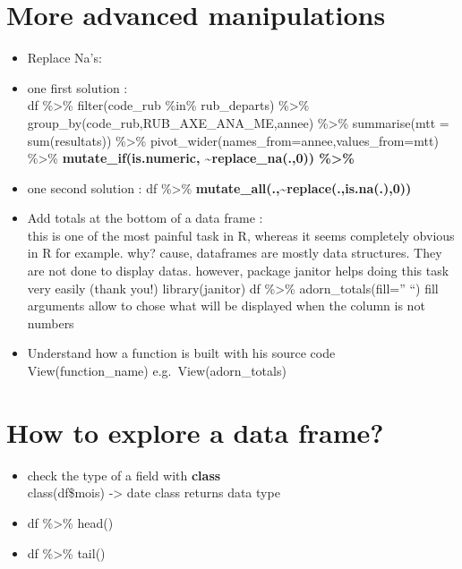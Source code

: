 \documentclass[
]{book}
\begin{document}
\hypertarget{more-advanced-manipulations}{%
\section{More advanced manipulations}\label{more-advanced-manipulations}}

\begin{itemize}
\item
  Replace Na's:\\
\item
  one first solution :\\
  df \%\textgreater\% filter(code\_rub \%in\% rub\_departs) \%\textgreater\%
  group\_by(code\_rub,RUB\_AXE\_ANA\_ME,annee) \%\textgreater\% summarise(mtt = sum(resultats)) \%\textgreater\%
  pivot\_wider(names\_from=annee,values\_from=mtt) \%\textgreater\% \textbf{mutate\_if(is.numeric, \textasciitilde replace\_na(.,0)) \%\textgreater\%}
\item
  one second solution :
  df \%\textgreater\% \textbf{mutate\_all(.,\textasciitilde replace(.,is.na(.),0))}
\item
  Add totals at the bottom of a data frame :\\
  this is one of the most painful task in R, whereas it seems completely obvious in R for example.
  why? cause, dataframes are mostly data structures. They are not done to display datas.
  however, package janitor helps doing this task very easily (thank you!)
  library(janitor)
  df \%\textgreater\% adorn\_totals(fill='' ``)
  fill arguments allow to chose what will be displayed when the column is not numbers
\item
  Understand how a function is built with his source code
  View(function\_name)
  e.g.~View(adorn\_totals)
\end{itemize}

\hypertarget{how-to-explore-a-data-frame}{%
\section{How to explore a data frame?}\label{how-to-explore-a-data-frame}}

\begin{itemize}
\item
  check the type of a field with \textbf{class}\\
  class(df\$mois) -\textgreater{} date
  class returns data type
\item
  df \%\textgreater\% head()
\item
  df \%\textgreater\% tail()
\end{itemize}
\end{document}
